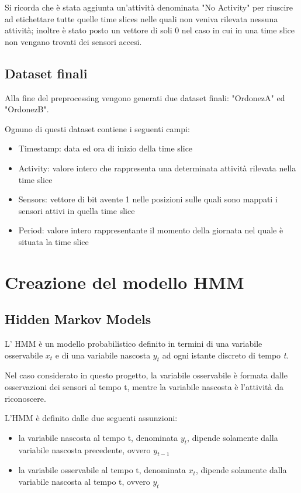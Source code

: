\documentclass[10pt,a4paper]{article}
\begin{document}
Si ricorda che è stata aggiunta un'attività denominata "No Activity" per riuscire ad etichettare tutte quelle time slices nelle quali non veniva rilevata nessuna attività; inoltre è stato posto un vettore di soli 0 nel caso in cui in una time slice non vengano trovati dei sensori accesi.

\subsection{Dataset finali}
Alla fine del preprocessing vengono generati due dataset finali: "OrdonezA" ed "OrdonezB".

Ognuno di questi dataset contiene i seguenti campi:

\begin{itemize}
	\item Timestamp: data ed ora di inizio della time slice
	\item Activity: valore intero che rappresenta una determinata attività rilevata nella time slice
	\item Sensors: vettore di bit avente 1 nelle posizioni sulle quali sono mappati i sensori attivi in quella time slice
	\item Period: valore intero rappresentante il momento della giornata nel quale è situata la time slice
\end{itemize}
\clearpage

\section{Creazione del modello HMM}

\subsection{Hidden Markov Models}
L' HMM è un modello probabilistico definito in termini di una variabile osservabile $ x_{t} $ e di una variabile nascosta $ y_{t} $ ad ogni istante discreto di tempo \textit{t}.

Nel caso considerato in questo progetto, la variabile osservabile è formata dalle osservazioni dei sensori al tempo t, mentre la variabile nascosta è l'attività da riconoscere.

L'HMM è definito dalle due seguenti assunzioni:

\begin{itemize}
	\item la variabile nascosta al tempo t, denominata $ y_{t} $, dipende solamente dalla variabile nascosta precedente, ovvero $ y_{t - 1} $
	\item la variabile osservabile al tempo t, denominata $ x_{t} $, dipende solamente dalla variabile nascosta al tempo t, ovvero $ y_{t} $
\end{itemize}
\end{document}
